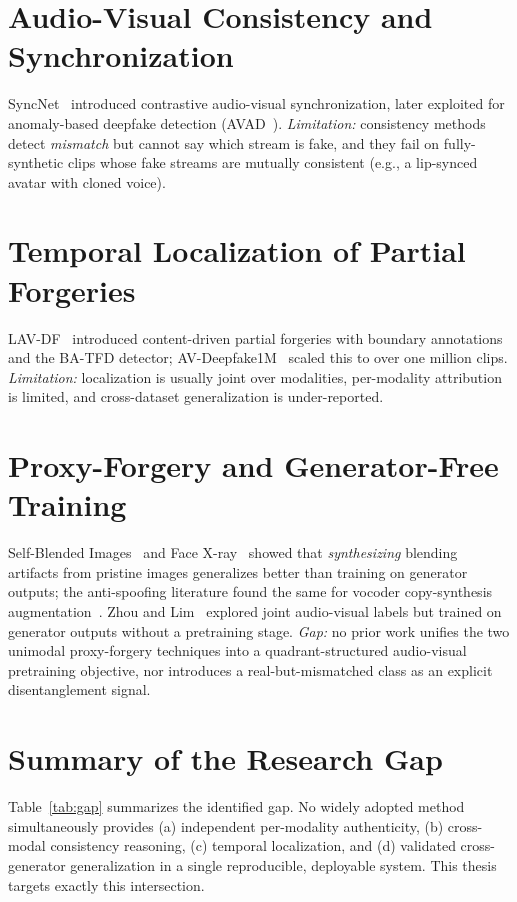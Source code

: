\section{Audio-Visual Consistency and Synchronization}
SyncNet~\cite{chung2016syncnet} introduced contrastive audio-visual
synchronization, later exploited for anomaly-based deepfake detection
(AVAD~\cite{feng2023avanomaly}). \emph{Limitation:} consistency methods detect
\emph{mismatch} but cannot say which stream is fake, and they fail on
fully-synthetic clips whose fake streams are mutually consistent (e.g., a
lip-synced avatar with cloned voice).

\section{Temporal Localization of Partial Forgeries}
LAV-DF~\cite{cai2022lavdf} introduced content-driven partial forgeries with
boundary annotations and the BA-TFD detector; AV-Deepfake1M~\cite{cai2023avdeepfake1m}
scaled this to over one million clips. \emph{Limitation:} localization is usually
joint over modalities, per-modality attribution is limited, and cross-dataset
generalization is under-reported.

\section{Proxy-Forgery and Generator-Free Training}
Self-Blended Images~\cite{shiohara2022sbi} and Face X-ray~\cite{li2020facexray}
showed that \emph{synthesizing} blending artifacts from pristine images
generalizes better than training on generator outputs; the anti-spoofing
literature found the same for vocoder copy-synthesis
augmentation~\cite{wang2023vocoded}. Zhou and Lim~\cite{zhou2021joint} explored
joint audio-visual labels but trained on generator outputs without a pretraining
stage. \emph{Gap:} no prior work unifies the two unimodal proxy-forgery techniques
into a quadrant-structured audio-visual pretraining objective, nor introduces a
real-but-mismatched class as an explicit disentanglement signal.

\section{Summary of the Research Gap}
Table~\ref{tab:gap} summarizes the identified gap. No widely adopted method
simultaneously provides (a) independent per-modality authenticity, (b) cross-modal
consistency reasoning, (c) temporal localization, and (d) validated
cross-generator generalization in a single reproducible, deployable system. This
thesis targets exactly this intersection.

